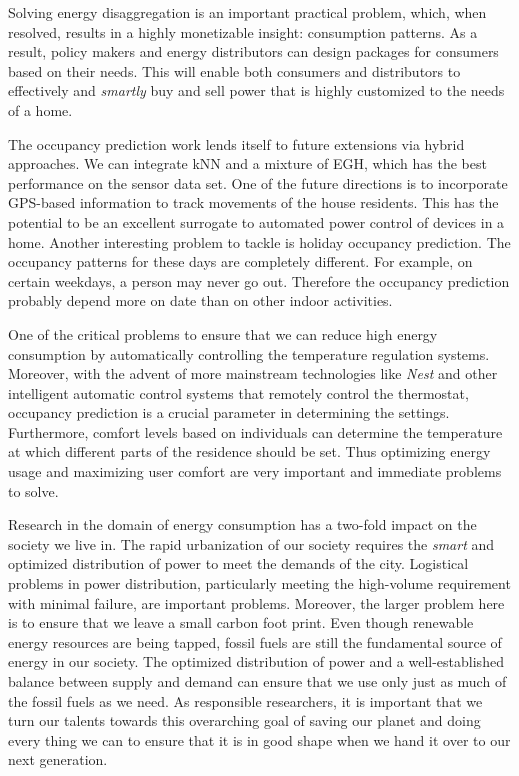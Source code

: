Solving energy disaggregation is an important practical problem, which, when resolved, results in a highly monetizable insight: consumption patterns. As a result, policy makers and energy distributors can design packages for consumers based on their needs. This will enable both consumers and distributors to effectively and \emph{smartly} buy and sell power that is highly customized to the needs of a home.


The occupancy prediction work lends itself to future extensions via hybrid approaches. We can integrate kNN and a mixture of EGH, which has the best performance on the sensor data set. One of the future directions is to incorporate GPS-based information to track movements of the house residents. This has the potential to be an excellent surrogate to automated power control of devices in a home. Another interesting problem to tackle is holiday occupancy prediction. The occupancy patterns for these days are completely different. For example, on certain weekdays, a person may never go out. Therefore the occupancy prediction probably depend more on date than on other indoor activities. 

One of the critical problems to ensure that we can reduce high energy consumption by automatically controlling the temperature regulation systems. Moreover, with the advent of more mainstream technologies like \emph{Nest} and other intelligent automatic control systems that remotely control the thermostat, occupancy prediction is a crucial parameter in determining the settings. Furthermore, comfort levels based on individuals can determine the temperature at which different parts of the residence should be set. Thus optimizing energy usage and maximizing user comfort are very important and immediate problems to solve.

Research in the domain of energy consumption has a two-fold impact on the society we live in. The rapid urbanization of our society requires the \emph{smart} and optimized distribution of power to meet the demands of the city. Logistical problems in power distribution, particularly meeting the high-volume requirement with minimal failure, are important problems. Moreover, the larger problem here is to ensure that we leave a small carbon foot print. Even though renewable energy resources are being tapped, fossil fuels are still the fundamental source of energy in our society. The optimized distribution of power and a well-established balance between supply and demand can ensure that we use only just as much of the fossil fuels as we need. As responsible researchers, it is important that we turn our talents towards this overarching goal of saving our planet and doing every thing we can to ensure that it is in good shape when we hand it over to our next generation.
